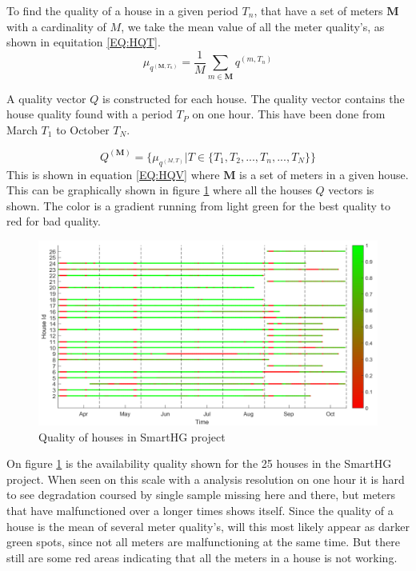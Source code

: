 To find the quality of a house in a given period $T_n$, that have a set of meters $\mathbf{M}$ with a cardinality of $M$, we take the mean value of all the meter quality's, as shown in equitation \ref{EQ:HQT}.  
\begin{equation}
	\mu_{q^{(\mathbf{M},T_n)}} = \frac{1}{M} \sum_{m \in \mathbf{M}} q^{(m,T_n)}
	\label{EQ:HQT}
\end{equation}



A quality vector $Q$ is constructed for each house. The quality vector contains the house quality found with a period $T_P$ on one hour. This have been done from March $T_1$ to October $T_N$. 

\begin{equation}
	Q^{(\mathbf{M})} = \{ \mu_{q^{(M,T)}} | T \in \{T_1, T_2, ... ,T_n,..., T_N  \} \}
	\label{EQ:HQV}
\end{equation}
This is shown in equation \ref{EQ:HQV} where $\mathbf{M}$ is a set of meters in a given house. This can be graphically shown in figure \ref{fig:SmartHGQuality} where all the houses $Q$ vectors is shown. The color is a gradient running from light green for the best quality to red for bad quality.
\begin{figure}[H]
\centering
\includegraphics[width=1\textwidth]{billeder/QualityBig.png}
\caption{Quality of houses in SmartHG project}
\label{fig:SmartHGQuality}
\end{figure} 

On figure \ref{fig:SmartHGQuality} is the availability quality shown for the 25 houses in the SmartHG project. When seen on this scale with a analysis resolution on one hour it is hard to see degradation coursed by single sample missing here and there, but meters that have malfunctioned over a longer times shows itself. Since the quality of a house is the mean of several meter quality's, will this most likely appear as darker green spots, since not all meters are malfunctioning at the same time. But there still are some red areas indicating that all the meters in a house is not working. 

